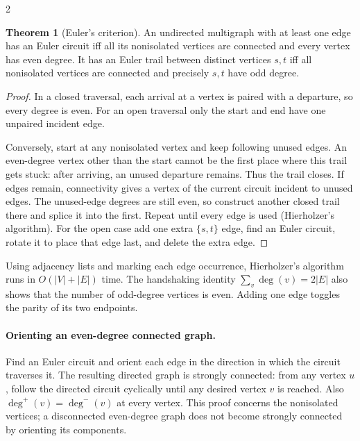 \documentclass[10pt]{article}
\theoremstyle{definition}
\newtheorem{theorem}[definition]{Theorem}
\begin{document}
\begin{multicols*}{2}
\begin{theorem}[Euler's criterion]
An undirected multigraph with at least one edge has an Euler circuit iff
all its nonisolated vertices are connected and every vertex has even degree.
It has an Euler trail between distinct vertices $s,t$ iff all nonisolated
vertices are connected and precisely $s,t$ have odd degree.
\end{theorem}
\begin{proof}
In a closed traversal, each arrival at a vertex is paired with a departure,
so every degree is even.  For an open traversal only the start and end have
one unpaired incident edge.

Conversely, start at any nonisolated vertex and keep following unused edges.
An even-degree vertex other than the start cannot be the first place where
this trail gets stuck: after arriving, an unused departure remains.  Thus
the trail closes.  If edges remain, connectivity gives a vertex of the
current circuit incident to unused edges.  The unused-edge degrees are
still even, so construct another closed trail there and splice it into the
first.  Repeat until every edge is used (Hierholzer's algorithm).
For the open case add one extra $\{s,t\}$ edge, find an Euler circuit,
rotate it to place that edge last, and delete the extra edge.
\end{proof}
Using adjacency lists and marking each edge occurrence, Hierholzer's
algorithm runs in $O(|V|+|E|)$ time.  The handshaking identity
$\sum_v\deg(v)=2|E|$ also shows that the number of odd-degree vertices is
even.  Adding one edge toggles the parity of its two endpoints.

\paragraph{Orienting an even-degree connected graph.}
Find an Euler circuit and orient each edge in the direction in which the
circuit traverses it.  The resulting directed graph is strongly connected:
from any vertex $u$, follow the directed circuit cyclically until any desired
vertex $v$ is reached.  Also $\deg^+(v)=\deg^-(v)$ at every vertex.
This proof concerns the nonisolated vertices; a disconnected even-degree
graph does not become strongly connected by orienting its components.


\end{multicols*}
\end{document}
